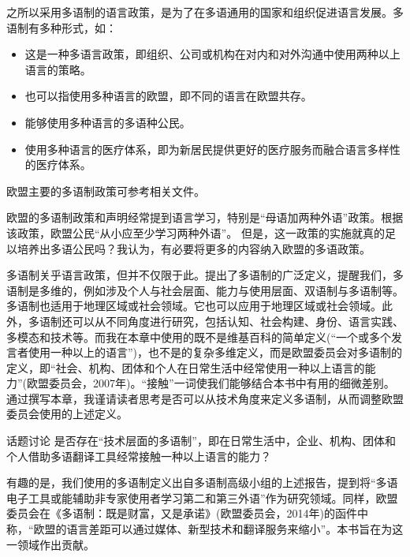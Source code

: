 \documentclass[output=paper]{langscibook}
\begin{document}
之所以采用多语制的语言政策，是为了在多语通用的国家和组织促进语言发展。多语制有多种形式，如：

\begin{itemize}
\item 这是一种多语言政策，即组织、公司或机构在对内和对外沟通中使用两种以上语言的策略。
\item ‌也可以指使用多种语言的欧盟，即不同的语言在欧盟共存。
\item ‌能够使用多种语言的多语种公民。
\item ‌使用多种语言的医疗体系，即为新居民提供更好的医疗服务而融合语言多样性的医疗体系。
\end{itemize}

欧盟主要的多语制政策可参考相关文件\citep{EuropeanCouncil2002, EuropeanCommission2008, CounciloftheEU2008may, CounciloftheEU2008dec, CounciloftheEU2011, CounciloftheEU2014, EuropeanCouncil2017}。

‌欧盟的多语制政策和声明经常提到语言学习，特别是“母语加两种外语”政策。根据该政策，欧盟公民“从小应至少学习两种外语”\citep{EuropeanCouncil2002}。 ‌但是，这一政策的实施就真的足以培养出多语公民吗？‌我认为，有必要将更多的内容纳入欧盟的多语政策。

多语制关乎语言政策，但并不仅限于此。\citet{Cenoz2013}提出了多语制的广泛定义，提醒我们，多语制是多维的，例如涉及个人与社会层面、能力与使用层面、双语制与多语制等。多语制也适用于地理区域或社会领域。它也可以应用于地理区域或社会领域。‌此外，多语制还可以从不同角度进行研究，包括认知、社会构建、身份、语言实践、多模态和技术等。而我在本章中使用的既不是维基百科的简单定义(“一个或多个发言者使用一种以上的语言”)，也不是\citet{Cenoz2013}‌的复杂多维定义，而是欧盟委员会对多语制的定义，即“社会、机构、团体和个人在日常生活中经常使用一种以上语言的能力”(‌欧盟委员会，2007‌年)。‌“接触”一词使我们能够结合本书中有用的细微差别。‌通过撰写本章，我谨请读者思考是否可以从技术角度来定义多语制，从而调整欧盟委员会使用的上述定义。

\begin{tblsframed}{话题讨论}
‌是否存在“技术层面的多语制”，即在日常生活中，企业、机构、团体和个人借助多语翻译工具经常接触一种以上语言的能力？
\end{tblsframed}

有趣的是，我们使用的多语制定义出自多语制高级小组的上述报告，提到将“多语电子工具或能辅助非专家使用者学习第二和第三外语”作为研究领域\citep{EuropeanCommission2007}。‌同样，欧盟委员会在《多语制：既是财富，又是承诺》(‌欧盟委员会，2014年‌)的函件中称，“欧盟的语言差距可以通过媒体、新型技术和翻译服务来缩小”。‌本书旨在为这一领域作出贡献。
\end{document}
